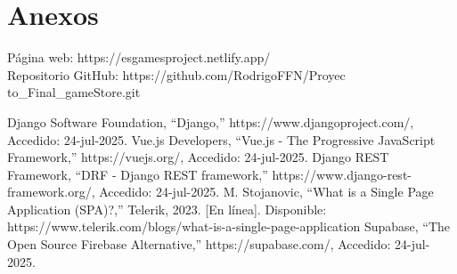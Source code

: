 \documentclass[conference]{IEEEtran}
\begin{document}
\section*{Anexos}

Página web: https://esgamesproject.netlify.app/\\

Repositorio GitHub: https://github.com/RodrigoFFN/Proyec\\to\_Final\_gameStore.git

\begin{thebibliography}{00}
 Django Software Foundation, “Django,” https://www.djangoproject.com/, Accedido: 24-jul-2025.
 Vue.js Developers, “Vue.js - The Progressive JavaScript Framework,” https://vuejs.org/, Accedido: 24-jul-2025.
 Django REST Framework, “DRF - Django REST framework,” https://www.django-rest-framework.org/, Accedido: 24-jul-2025.
 M. Stojanovic, “What is a Single Page Application (SPA)?,” Telerik, 2023. [En línea]. Disponible: https://www.telerik.com/blogs/what-is-a-single-page-application
 Supabase, “The Open Source Firebase Alternative,” https://supabase.com/, Accedido: 24-jul-2025.

\end{thebibliography}
\end{document}
